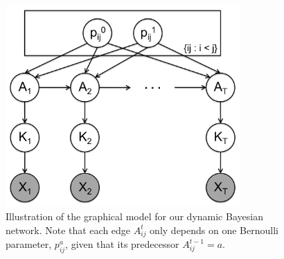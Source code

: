 \documentclass{article}
\begin{document}
\begin{figure}[tbp]
\centering
  \begin{minipage}[c]{0.6\linewidth}
      \centering               
      \includegraphics[width=0.8\textwidth]{fig/dynamic_ggm_model.png}
      \caption{Illustration of the graphical model for our dynamic Bayesian network. Note that each edge $A_{ij}^t$ only depends on one Bernoulli parameter, $p_{ij}^{a}$, given that its predecessor $A_{ij}^{t-1} = a$.}
      \label{fig:dynamicModel}
  \end{minipage}
  \hspace{0.05\linewidth}
  \begin{minipage}[c]{0.24\linewidth}
      \centering               

\end{minipage}
\end{figure}
\end{document}
